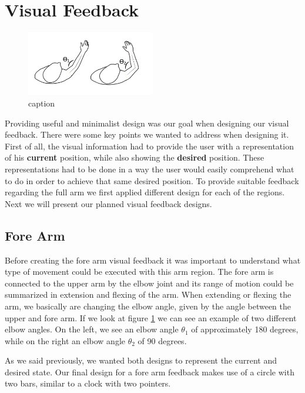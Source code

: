 \section{Visual Feedback}

\begin{figure}[!t]
    \begin{center}
        \includegraphics[width=0.5\textwidth]{imgs/elbowangle.png}
    \end{center}
    \caption{caption}
    \label{fig:elbowangle}
\end{figure}

Providing useful and minimalist design was our goal when designing our visual feedback. There were some key points we wanted to address when designing it.
First of all, the visual information had to provide the user with a representation of his \textbf{current} position, while also showing the \textbf{desired} position. 
These representations had to be done in a way the user would easily comprehend what to do in order to achieve that same desired position.
To provide suitable feedback regarding the full arm we first applied different design for each of the regions. Next we will present our planned visual feedback designs.

\subsection{Fore Arm}

Before creating the fore arm visual feedback it was important to understand what type of movement could be executed with this arm region.
The fore arm is connected to the upper arm by the elbow joint and its range of motion could be summarized in extension and flexing of the arm.
When extending or flexing the arm, we basically are changing the elbow angle, given by the angle between the upper and fore arm.
If we look at figure \ref{fig:elbowangle} we can see an example of two different elbow angles. On the left, we see an elbow angle $\theta$$_1$ of approximately 180 degrees, while on the right an elbow angle $\theta$$_2$ of 90 degrees.  

As we said previously, we wanted both designs to represent the current and desired state. Our final design for a fore arm feedback makes use of a circle with two bars, similar to a clock with two pointers.

